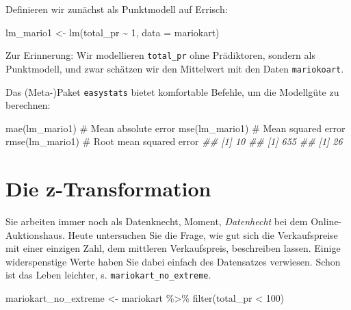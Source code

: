\documentclass[
  letterpaper,
  oneside,
  open=any]{scrbook}
\newenvironment{Shaded}{\begin{snugshade}}{\end{snugshade}}
\newcommand{\AttributeTok}[1]{\textcolor[rgb]{0.40,0.45,0.13}{#1}}
\newcommand{\CommentTok}[1]{\textcolor[rgb]{0.37,0.37,0.37}{#1}}
\newcommand{\DecValTok}[1]{\textcolor[rgb]{0.68,0.00,0.00}{#1}}
\newcommand{\DocumentationTok}[1]{\textcolor[rgb]{0.37,0.37,0.37}{\textit{#1}}}
\newcommand{\FunctionTok}[1]{\textcolor[rgb]{0.28,0.35,0.67}{#1}}
\newcommand{\NormalTok}[1]{\textcolor[rgb]{0.00,0.23,0.31}{#1}}
\newcommand{\OtherTok}[1]{\textcolor[rgb]{0.00,0.23,0.31}{#1}}
\newcommand{\SpecialCharTok}[1]{\textcolor[rgb]{0.37,0.37,0.37}{#1}}
\theoremstyle{definition}
\theoremstyle{definition}
\theoremstyle{definition}
\theoremstyle{remark}
\begin{document}
Definieren wir zunächst als Punktmodell auf Errisch:

\begin{Shaded}
\begin{Highlighting}[]
\NormalTok{lm\_mario1 }\OtherTok{\textless{}{-}} \FunctionTok{lm}\NormalTok{(total\_pr }\SpecialCharTok{\textasciitilde{}} \DecValTok{1}\NormalTok{, }\AttributeTok{data =}\NormalTok{ mariokart)}
\end{Highlighting}
\end{Shaded}

Zur Erinnerung: Wir modellieren \texttt{total\_pr} ohne Prädiktoren,
sondern als Punktmodell, und zwar schätzen wir den Mittelwert mit den
Daten \texttt{mariokoart}.

Das (Meta-)Paket \texttt{easystats} bietet komfortable Befehle, um die
Modellgüte zu berechnen:

\begin{Shaded}
\begin{Highlighting}[]
\FunctionTok{mae}\NormalTok{(lm\_mario1)  }\CommentTok{\# Mean absolute error}
\FunctionTok{mse}\NormalTok{(lm\_mario1)  }\CommentTok{\# Mean squared error}
\FunctionTok{rmse}\NormalTok{(lm\_mario1)  }\CommentTok{\# Root mean squared error}
\DocumentationTok{\#\# [1] 10}
\DocumentationTok{\#\# [1] 655}
\DocumentationTok{\#\# [1] 26}
\end{Highlighting}
\end{Shaded}

\section{Die z-Transformation}\label{die-z-transformation}

Sie arbeiten immer noch als Datenknecht, Moment, \emph{Datenhecht} bei
dem Online-Auktionshaus. Heute untersuchen Sie die Frage, wie gut sich
die Verkaufspreise mit einer einzigen Zahl, dem mittleren Verkaufspreis,
beschreiben lassen. Einige widerspenstige Werte haben Sie dabei einfach
des Datensatzes verwiesen. Schon ist das Leben leichter, s.
\texttt{mariokart\_no\_extreme}.

\begin{Shaded}
\begin{Highlighting}[]
\NormalTok{mariokart\_no\_extreme }\OtherTok{\textless{}{-}} 
\NormalTok{  mariokart }\SpecialCharTok{\%\textgreater{}\%} 
  \FunctionTok{filter}\NormalTok{(total\_pr }\SpecialCharTok{\textless{}} \DecValTok{100}\NormalTok{)}
\end{Highlighting}
\end{Shaded}
\end{document}
